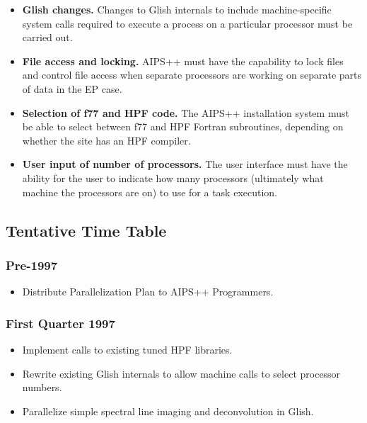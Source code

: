 \begin{itemize}

\item {\bf Glish changes.}  Changes to Glish internals to include
machine-specific system calls required to execute a process on a
particular processor must be carried out.

\item {\bf File access and locking.}  AIPS++ must have the capability
to lock files and control file access when separate processors are
working on separate parts of data in the EP case.

\item {\bf Selection of f77 and HPF code.}  The AIPS++ installation
system must be able to select between f77 and HPF Fortran subroutines,
depending on whether the site has an HPF compiler.

\item {\bf User input of number of processors.}  The user interface
must have the ability for the user to indicate how many processors
(ultimately what machine the processors are on) to use for a task
execution.

\end{itemize}

\subsection{Tentative Time Table}

\subsubsection{Pre-1997}

\begin{itemize}

\item Distribute Parallelization Plan to AIPS++ Programmers.

\end{itemize}

\subsubsection{First Quarter 1997}

\begin{itemize}

\item Implement calls to existing tuned HPF libraries.

\item Rewrite existing Glish internals to allow machine calls to
select processor numbers.

\item Parallelize simple spectral line imaging and deconvolution
in Glish.

\end{itemize}

